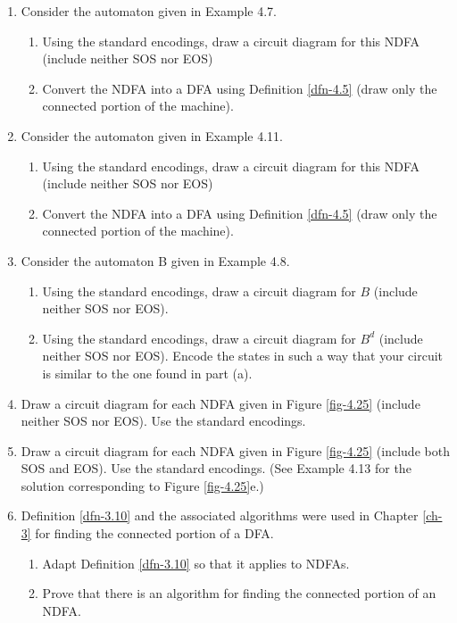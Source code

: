 \begin{enumerate}[{4.}1.]
\item Consider the automaton given in Example 4.7.
\begin{enumerate}
\item Using the standard encodings, draw a circuit diagram for this NDFA
(include neither \<SOS\> nor \<EOS\>)
\item Convert the NDFA into a DFA using Definition \ref{dfn-4.5} (draw only the connected
portion of the machine).
\end{enumerate}

\item Consider the automaton given in Example 4.11.
\begin{enumerate}
\item Using the standard encodings, draw a circuit diagram for this NDFA
(include neither \<SOS\> nor \<EOS\>)
\item Convert the NDFA into a DFA using Definition \ref{dfn-4.5} (draw only the connected
portion of the machine).
\end{enumerate}

\item Consider the automaton B given in Example 4.8.
\begin{enumerate}
\item Using the standard encodings, draw a circuit diagram for $B$ (include
neither \<SOS\> nor \<EOS\>).
\item Using the standard encodings, draw a circuit diagram for $B^d$ (include
neither \<SOS\> nor \<EOS\>). Encode the states in such a way that your circuit is similar
to the one found in part (a).
\end{enumerate}

\item Draw a circuit diagram for each NDFA given in Figure \ref{fig-4.25} (include
neither \<SOS\> nor \<EOS\>). Use the standard encodings.

\item Draw a circuit diagram for each NDFA given in Figure \ref{fig-4.25} (include both
\<SOS\> and \<EOS\>). Use the standard encodings.
(See Example 4.13 for the solution corresponding to Figure \ref{fig-4.25}e.)


\item Definition \ref{dfn-3.10} and the associated algorithms were used in Chapter \ref{ch-3} for
finding the connected portion of a DFA.
\begin{enumerate}
\item Adapt Definition \ref{dfn-3.10} so that it applies to NDFAs.
\item Prove that there is an algorithm for finding the connected portion of an
NDFA.
\end{enumerate}
\end{enumerate}
